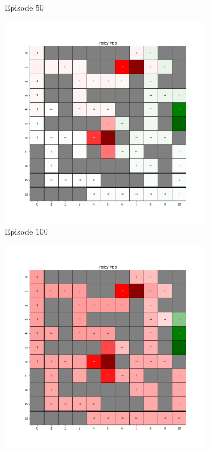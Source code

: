 \documentclass{assignment}
\begin{document}
\begin{figure}[H]
\begin{subfigure}{0.3\textwidth}
    \caption{Episode 50}
    \end{subfigure}\hfill
    \begin{subfigure}{0.3\textwidth}
        \includegraphics[width=\textwidth]{figures/policy_td/alpha_sweep/policy_alpha_0.001_gamma_0.95_epsilon_0.2_iteration_100.png}
    \caption{Episode 100}
    \end{subfigure}
    \begin{subfigure}{0.3\textwidth}
        \includegraphics[width=\textwidth]{figures/policy_td/alpha_sweep/policy_alpha_0.001_gamma_0.95_epsilon_0.2_iteration_1000.png}

\end{subfigure}
\end{figure}
\end{document}
